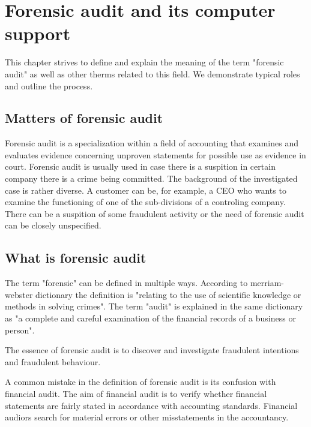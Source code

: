 \chapter{Forensic audit and its computer support}




This chapter strives to define and explain the meaning of the term "forensic audit" as well as other therms related to this field. We demonstrate typical roles and outline the process. 

\section{Matters of forensic audit}
Forensic audit is a specialization within a field of accounting that examines and evaluates evidence concerning unproven statements for possible use as evidence in court. Forensic audit is usually used in case there is a suspition in certain company there is a crime being committed. The background of the investigated case is rather diverse. A customer can be, for example, a CEO  who wants to examine the functioning of one of the sub-divisions of a controling company. There can be a suspition of some fraudulent activity or the need of forensic audit can be closely unspecified.

\section{What is forensic audit}
The term "forensic" can be defined in multiple ways. According to merriam-webster dictionary  the definition is "relating to the use of scientific knowledge or methods in solving crimes". The term "audit" is explained in the same dictionary as "a complete and careful examination of the financial records of a business or person". 

The essence of forensic audit is to discover and investigate fraudulent intentions and fraudulent behaviour. 

A common mistake in the definition of forensic audit is its confusion with financial audit. The aim of financial audit is to verify whether financial statements are fairly stated in accordance with accounting standards. Financial audiors search for material errors or other misstatements in the accountancy.

